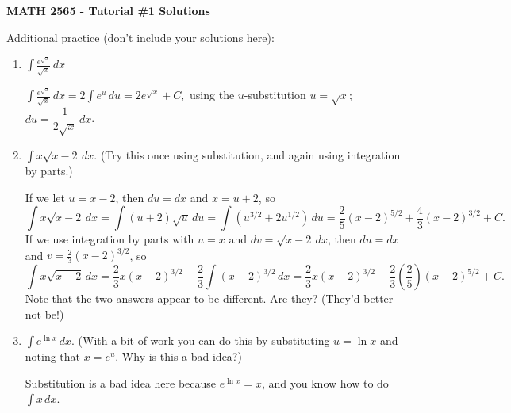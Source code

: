 \documentclass[12pt]{article}
\newcommand{\di}{\displaystyle}
\begin{document}
\author{Instructor: Sean Fitzpatrick}
\thispagestyle{empty}
\begin{center}
{\bf MATH 2565 - Tutorial \#1 Solutions}
\end{center}

Additional practice (don't include your solutions here):
\begin{enumerate}
 \item  $\di \int \frac{e^{\sqrt{x}}}{\sqrt{x}}\,dx$
 
 \bigskip
 
$\di \int \frac{e^{\sqrt{x}}}{\sqrt{x}}\,dx = 2\int e^u\,du = 2e^{\sqrt{x}}+C,$ using the $u$-substitution $u=\sqrt{x}$; $du = \dfrac{1}{2\sqrt{x}}\,dx$.
 
 \bigskip

 \item $\di \int x\sqrt{x-2}\,dx$. (Try this once using substitution, and again using integration by parts.)
 
 \bigskip
  
 If we let $u=x-2$, then $du=dx$ and $x=u+2$, so
\[
 \int x\sqrt{x-2}\,dx = \int (u+2)\sqrt{u}\,du = \int (u^{3/2}+2u^{1/2})\,du = \frac{2}{5}(x-2)^{5/2}+\frac{4}{3}(x-2)^{3/2}+C.
\]
If we use integration by parts with $u=x$ and $dv = \sqrt{x-2}\,dx$, then $du=dx$ and $v = \frac{2}{3}(x-2)^{3/2}$, so
\[
 \int x\sqrt{x-2}\,dx = \frac{2}{3}x(x-2)^{3/2}-\frac{2}{3}\int (x-2)^{3/2}\,dx = \frac{2}{3}x(x-2)^{3/2}-\frac{2}{3}\left(\frac{2}{5}\right)(x-2)^{5/2}+C.
\]
Note that the two answers appear to be different. Are they? (They'd better not be!)

\bigskip



 \item $\di \int e^{\ln x}\,dx$. (With a bit of work you can do this by substituting $u=\ln x$ and noting that $x=e^u$. Why is this a bad idea?)
 
 \bigskip
 
 Substitution is a bad idea here because $e^{\ln x} = x$, and you know how to do $\int x\,dx$.
\end{enumerate}  

\medskip
\end{document}
